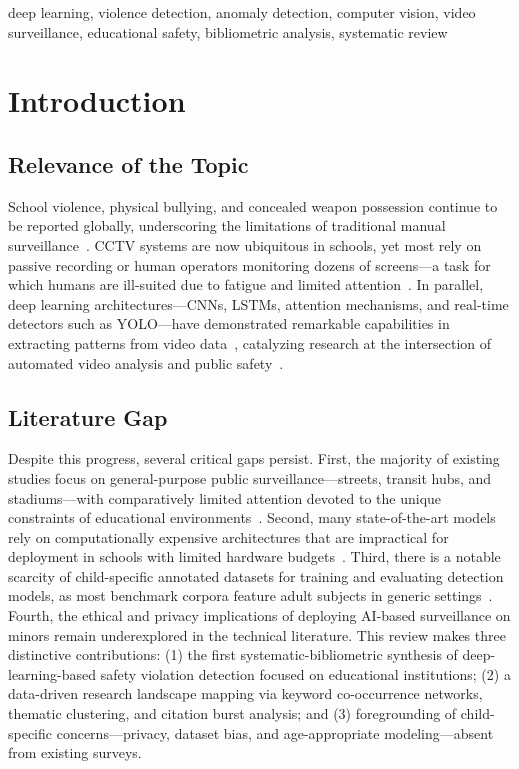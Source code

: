 \documentclass[conference]{IEEEtran}
\begin{document}
\begin{IEEEkeywords}
deep learning, violence detection, anomaly detection, computer vision, video surveillance, educational safety, bibliometric analysis, systematic review
\end{IEEEkeywords}

\section{Introduction}

\subsection{Relevance of the Topic}

School violence, physical bullying, and concealed weapon possession continue to be reported globally, underscoring the limitations of traditional manual surveillance~\cite{b1,b2}. CCTV systems are now ubiquitous in schools, yet most rely on passive recording or human operators monitoring dozens of screens---a task for which humans are ill-suited due to fatigue and limited attention~\cite{b3,b4,b26}. In parallel, deep learning architectures---CNNs, LSTMs, attention mechanisms, and real-time detectors such as YOLO---have demonstrated remarkable capabilities in extracting patterns from video data~\cite{b5,b6,b7}, catalyzing research at the intersection of automated video analysis and public safety~\cite{b8,b9,b10}.

\subsection{Literature Gap}

Despite this progress, several critical gaps persist. First, the majority of existing studies focus on general-purpose public surveillance---streets, transit hubs, and stadiums---with comparatively limited attention devoted to the unique constraints of educational environments~\cite{b11,b12}. Second, many state-of-the-art models rely on computationally expensive architectures that are impractical for deployment in schools with limited hardware budgets~\cite{b13,b14}. Third, there is a notable scarcity of child-specific annotated datasets for training and evaluating detection models, as most benchmark corpora feature adult subjects in generic settings~\cite{b15,b16}. Fourth, the ethical and privacy implications of deploying AI-based surveillance on minors remain underexplored in the technical literature. This review makes three distinctive contributions: (1) the first systematic-bibliometric synthesis of deep-learning-based safety violation detection focused on educational institutions; (2) a data-driven research landscape mapping via keyword co-occurrence networks, thematic clustering, and citation burst analysis; and (3) foregrounding of child-specific concerns---privacy, dataset bias, and age-appropriate modeling---absent from existing surveys.
\end{document}

